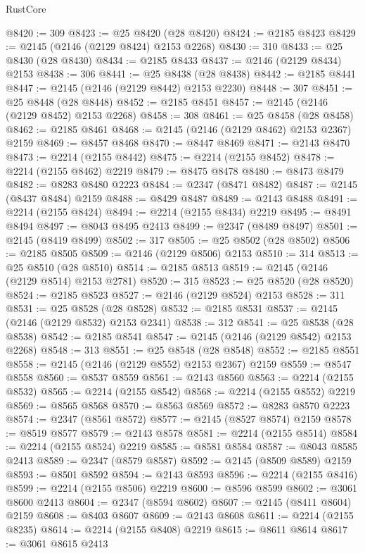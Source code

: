 \begin{lexlean}{RustCore}
\begin{coremodule}
@8420 := 309
@8423 := @25 @8420 (@28 @8420)
@8424 := @2185 @8423
@8429 := @2145 (@2146 (@2129 @8424) @2153 @2268)
@8430 := 310
@8433 := @25 @8430 (@28 @8430)
@8434 := @2185 @8433
@8437 := @2146 (@2129 @8434) @2153
@8438 := 306
@8441 := @25 @8438 (@28 @8438)
@8442 := @2185 @8441
@8447 := @2145 (@2146 (@2129 @8442) @2153 @2230)
@8448 := 307
@8451 := @25 @8448 (@28 @8448)
@8452 := @2185 @8451
@8457 := @2145 (@2146 (@2129 @8452) @2153 @2268)
@8458 := 308
@8461 := @25 @8458 (@28 @8458)
@8462 := @2185 @8461
@8468 := @2145 (@2146 (@2129 @8462) @2153 @2367) @2159
@8469 := @8457 @8468
@8470 := @8447 @8469
@8471 := @2143 @8470
@8473 := @2214 (@2155 @8442)
@8475 := @2214 (@2155 @8452)
@8478 := @2214 (@2155 @8462) @2219
@8479 := @8475 @8478
@8480 := @8473 @8479
@8482 := @8283 @8480 @2223
@8484 := @2347 (@8471 @8482)
@8487 := @2145 (@8437 @8484) @2159
@8488 := @8429 @8487
@8489 := @2143 @8488
@8491 := @2214 (@2155 @8424)
@8494 := @2214 (@2155 @8434) @2219
@8495 := @8491 @8494
@8497 := @8043 @8495 @2413
@8499 := @2347 (@8489 @8497)
@8501 := @2145 (@8419 @8499)
@8502 := 317
@8505 := @25 @8502 (@28 @8502)
@8506 := @2185 @8505
@8509 := @2146 (@2129 @8506) @2153
@8510 := 314
@8513 := @25 @8510 (@28 @8510)
@8514 := @2185 @8513
@8519 := @2145 (@2146 (@2129 @8514) @2153 @2781)
@8520 := 315
@8523 := @25 @8520 (@28 @8520)
@8524 := @2185 @8523
@8527 := @2146 (@2129 @8524) @2153
@8528 := 311
@8531 := @25 @8528 (@28 @8528)
@8532 := @2185 @8531
@8537 := @2145 (@2146 (@2129 @8532) @2153 @2341)
@8538 := 312
@8541 := @25 @8538 (@28 @8538)
@8542 := @2185 @8541
@8547 := @2145 (@2146 (@2129 @8542) @2153 @2268)
@8548 := 313
@8551 := @25 @8548 (@28 @8548)
@8552 := @2185 @8551
@8558 := @2145 (@2146 (@2129 @8552) @2153 @2367) @2159
@8559 := @8547 @8558
@8560 := @8537 @8559
@8561 := @2143 @8560
@8563 := @2214 (@2155 @8532)
@8565 := @2214 (@2155 @8542)
@8568 := @2214 (@2155 @8552) @2219
@8569 := @8565 @8568
@8570 := @8563 @8569
@8572 := @8283 @8570 @2223
@8574 := @2347 (@8561 @8572)
@8577 := @2145 (@8527 @8574) @2159
@8578 := @8519 @8577
@8579 := @2143 @8578
@8581 := @2214 (@2155 @8514)
@8584 := @2214 (@2155 @8524) @2219
@8585 := @8581 @8584
@8587 := @8043 @8585 @2413
@8589 := @2347 (@8579 @8587)
@8592 := @2145 (@8509 @8589) @2159
@8593 := @8501 @8592
@8594 := @2143 @8593
@8596 := @2214 (@2155 @8416)
@8599 := @2214 (@2155 @8506) @2219
@8600 := @8596 @8599
@8602 := @3061 @8600 @2413
@8604 := @2347 (@8594 @8602)
@8607 := @2145 (@8411 @8604) @2159
@8608 := @8403 @8607
@8609 := @2143 @8608
@8611 := @2214 (@2155 @8235)
@8614 := @2214 (@2155 @8408) @2219
@8615 := @8611 @8614
@8617 := @3061 @8615 @2413

\end{coremodule}
\end{lexlean}
